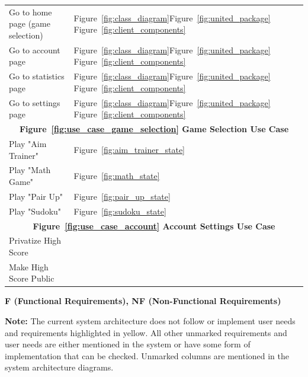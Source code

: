 \documentclass[11pt,a4paper]{article}
\begin{document}
\begin{table}
\begin{tabular}{|l|l|}
\hline
Go to home page (game selection)& Figure~\ref{fig:class_diagram}Figure~\ref{fig:united_package} Figure~\ref{fig:client_components}\\
Go to account page& Figure~\ref{fig:class_diagram}Figure~\ref{fig:united_package} Figure~\ref{fig:client_components}\\
Go to statistics page& Figure~\ref{fig:class_diagram}Figure~\ref{fig:united_package} Figure~\ref{fig:client_components}\\
Go to settings page& Figure~\ref{fig:class_diagram}Figure~\ref{fig:united_package} Figure~\ref{fig:client_components}\\
\hline
\multicolumn{2}{|c|}{\textbf {Figure~\ref{fig:use_case_game_selection} Game Selection Use Case} }           \\
\hline
Play "Aim Trainer"& Figure~\ref{fig:aim_trainer_state}\\
Play "Math Game"& Figure~\ref{fig:math_state}\\
Play "Pair Up"& Figure~\ref{fig:pair_up_state}\\
Play "Sudoku"& Figure~\ref{fig:sudoku_state}\\
\hline
\multicolumn{2}{|c|}{\textbf {Figure~\ref{fig:use_case_account} Account Settings Use Case} }   \\
\hline
Privatize High Score& \\
Make High Score Public& \\
\hline
\end{tabular}

\vspace{8pt} %

\textbf{F (Functional Requirements), NF (Non-Functional Requirements)}

\vspace{8pt} %

\textbf{Note:} The current system architecture does not follow or implement user needs and requirements highlighted in yellow. All other unmarked requirements and user needs are either mentioned in the system or have some form of implementation that can be checked. Unmarked columns are mentioned in the system architecture diagrams.
\end{table}





\end{document}
